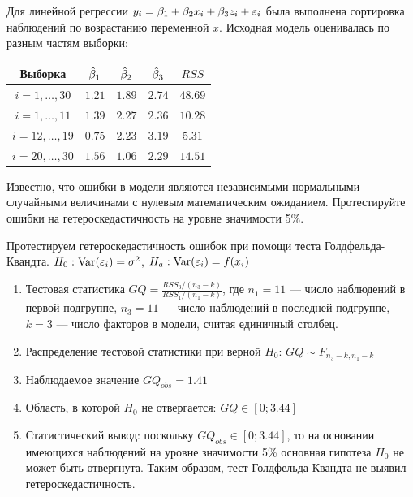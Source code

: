 \begin{problem}
Для линейной регрессии $y_i = \beta_1 + \beta_2 x_i + \beta_3 z_i + \varepsilon_i$ была
выполнена сортировка наблюдений по возрастанию переменной $x$. Исходная модель оценивалась по разным частям выборки:

\begin{tabular}{c|cccc}
\toprule
Выборка & $\hat{\beta}_1$ & $\hat{\beta}_2$ & $\hat{\beta}_3$ & $RSS$ \\
\midrule
$i=1,\ldots, 30$ & $1.21$ & $1.89$ & $2.74$ & $48.69$ \\
$i=1,\ldots, 11$ & $1.39$ & $2.27$ & $2.36$ & $10.28$ \\
$i=12,\ldots, 19$ & $0.75$ & $2.23$ & $3.19$ & $5.31$ \\
$i=20,\ldots, 30$ & $1.56$ & $1.06$ & $2.29$ & $14.51$ \\
\bottomrule
\end{tabular}

Известно, что ошибки в модели являются независимыми нормальными случайными величинами с нулевым математическим ожиданием. Протестируйте
ошибки на гетероскедастичность на уровне значимости 5\%.



\begin{sol}
Протестируем гетероскедастичность ошибок при помощи теста Голдфельда-
Квандта. $H_0: \operatorname{Var}(\varepsilon_i)=\sigma^2$, $H_a: \operatorname{Var}(\varepsilon_i)=f(x_i)$

\begin{enumerate}
\item Тестовая статистика $GQ=\frac{RSS_3/(n_3-k)}{RSS_1/(n_1-k)}$, где $n_1=11$ — число наблюдений в первой подгруппе, $n_3=11$ — число наблюдений в
последней подгруппе, $k=3$ — число факторов в модели, считая единичный столбец.
\item Распределение тестовой статистики при верной $H_0$: $GQ\sim F_{n_3-k,n_1-k}$
\item Наблюдаемое значение $GQ_{obs}=1.41$
\item Область, в которой $H_0$ не отвергается: $GQ\in [0;3.44]$
\item Статистический вывод: поскольку $GQ_{obs} \in [0;3.44]$, то на основании имеющихся наблюдений на уровне значимости 5\% основная гипотеза $H_0$ не может быть отвергнута. Таким образом, тест Голдфельда-Квандта не выявил гетероскедастичность.
\end{enumerate}
\end{sol}
\end{problem}



